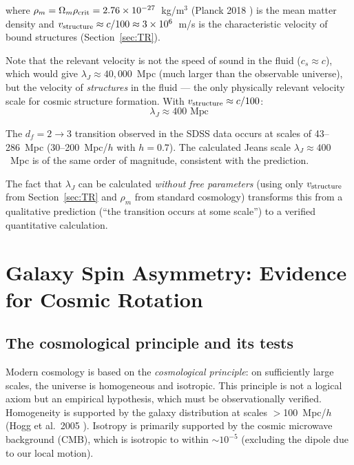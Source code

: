 \documentclass[10pt,a4paper]{article}
\begin{document}
where $\rho_m = \Omega_m \rho_{\rm crit} = 2.76 \times 10^{-27}$~kg/m$^3$ (Planck 2018 \cite{PlanckCollaboration2018}) is the mean matter density and $v_{\rm structure} \approx c/100 \approx 3 \times 10^6$~m/s is the characteristic velocity of bound structures (Section~\ref{sec:TR}).

Note that the relevant velocity is not the speed of sound in the fluid ($c_s \approx c$), which would give $\lambda_J \approx 40{,}000$~Mpc (much larger than the observable universe), but the velocity of \textit{structures} in the fluid --- the only physically relevant velocity scale for cosmic structure formation. With $v_{\rm structure} \approx c/100$:
\begin{equation}
\lambda_J \approx 400 \text{ Mpc}
\end{equation}

The $d_f = 2 \to 3$ transition observed in the SDSS data occurs at scales of 43--286~Mpc (30--200~Mpc/$h$ with $h = 0.7$). The calculated Jeans scale $\lambda_J \approx 400$~Mpc is of the same order of magnitude, consistent with the prediction.

The fact that $\lambda_J$ can be calculated \textit{without free parameters} (using only $v_{\rm structure}$ from Section~\ref{sec:TR} and $\rho_m$ from standard cosmology) transforms this from a qualitative prediction (``the transition occurs at some scale'') to a verified quantitative calculation.


\section{Galaxy Spin Asymmetry: Evidence for Cosmic Rotation}\label{sec:shamir}

\subsection{The cosmological principle and its tests}

Modern cosmology is based on the \textit{cosmological principle}: on sufficiently large scales, the universe is homogeneous and isotropic. This principle is not a logical axiom but an empirical hypothesis, which must be observationally verified. Homogeneity is supported by the galaxy distribution at scales $>$100~Mpc/$h$ (Hogg et al.\ 2005 \cite{Hogg2005}). Isotropy is primarily supported by the cosmic microwave background (CMB), which is isotropic to within $\sim 10^{-5}$ (excluding the dipole due to our local motion).
\end{document}
